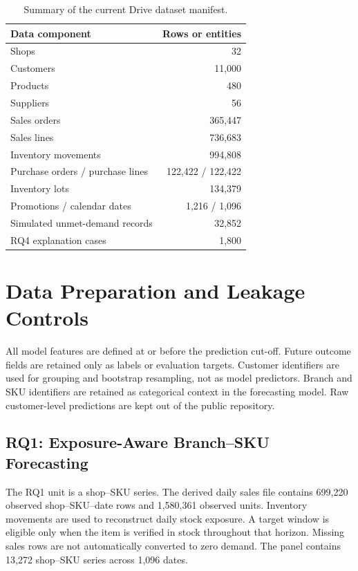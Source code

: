 \begin{table}[htbp]
\centering
\small
\begin{tabular}{lr}
\toprule
\textbf{Data component} & \textbf{Rows or entities}\\
\midrule
Shops & 32\\
Customers & 11,000\\
Products & 480\\
Suppliers & 56\\
Sales orders & 365,447\\
Sales lines & 736,683\\
Inventory movements & 994,808\\
Purchase orders / purchase lines & 122,422 / 122,422\\
Inventory lots & 134,379\\
Promotions / calendar dates & 1,216 / 1,096\\
Simulated unmet-demand records & 32,852\\
RQ4 explanation cases & 1,800\\
\bottomrule
\end{tabular}
\caption{Summary of the current Drive dataset manifest.}
\label{tab:dataset_profile}
\end{table}

\section{Data Preparation and Leakage Controls}
All model features are defined at or before the prediction cut-off. Future outcome fields are retained only as labels or evaluation targets. Customer identifiers are used for grouping and bootstrap resampling, not as model predictors. Branch and SKU identifiers are retained as categorical context in the forecasting model. Raw customer-level predictions are kept out of the public repository.

\subsection{RQ1: Exposure-Aware Branch--SKU Forecasting}
The RQ1 unit is a shop--SKU series. The derived daily sales file contains 699,220 observed shop--SKU--date rows and 1,580,361 observed units. Inventory movements are used to reconstruct daily stock exposure. A target window is eligible only when the item is verified in stock throughout that horizon. Missing sales rows are not automatically converted to zero demand. The panel contains 13,272 shop--SKU series across 1,096 dates.

